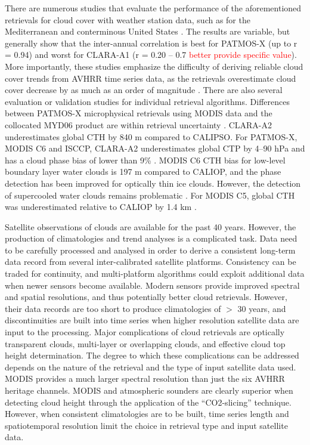 There are numerous studies that evaluate the performance of the aforementioned retrievals for cloud cover with weather station data, such as for the Mediterranean \citep{Sanchez17} and conterminous United States \citep{Sun15}. The results are variable, but generally show that the inter-annual correlation is best for PATMOS-X (up to r = 0.94) and worst for CLARA-A1 (r = 0.20 -- 0.7 \textcolor{red}{better provide specific value}). More importantly, these studies emphasize the difficulty of deriving reliable cloud cover trends from AVHRR time series data, as the retrievals overestimate cloud cover decrease by as much as an order of magnitude \citep{Sun15}. There are also several evaluation or validation studies for individual retrieval algorithms. Differences between PATMOS-X microphysical retrievals using MODIS data and the collocated MYD06 product are within retrieval uncertainty \citep{Walther12}. CLARA-A2 underestimates global CTH by 840 m compared to CALIPSO. For PATMOS-X, MODIS C6 and ISCCP, CLARA-A2 underestimates global CTP by 4--90 hPa and has a cloud phase bias of lower than 9\% \citep{CLARA_A2_PVIR}. MODIS C6 CTH bias for low-level boundary layer water clouds is 197 m compared to CALIOP, and the phase detection has been improved for optically thin ice clouds. However, the detection of supercooled water clouds remains problematic \citep{Baum12}. For MODIS C5, global CTH was underestimated relative to CALIOP by 1.4 km \citep{Holz08}.

Satellite observations of clouds are available for the past 40 years. However, the production of climatologies and trend analyses is a complicated task. Data need to be carefully processed and analysed in order to derive a consistent long-term data record from several inter-calibrated satellite platforms. Consistency can be traded for continuity, and multi-platform algorithms could exploit additional data when newer sensors become available. Modern sensors provide improved spectral and spatial resolutions, and thus potentially better cloud retrievals. However, their data records are too short to produce climatologies of $>$ 30 years, and discontinuities are built into time series when higher resolution satellite data are input to the processing. Major complications of cloud retrievals are optically transparent clouds, multi-layer or overlapping clouds, and effective cloud top height determination. The degree to which these complications can be addressed depends on the nature of the retrieval and the type of input satellite data used. MODIS provides a much larger spectral resolution than just the six AVHRR heritage channels. MODIS and atmospheric sounders are clearly superior when detecting cloud height through the application of the ``CO2-slicing'' technique. However, when consistent climatologies are to be built, time series length and spatiotemporal resolution limit the choice in retrieval type and input satellite data.


